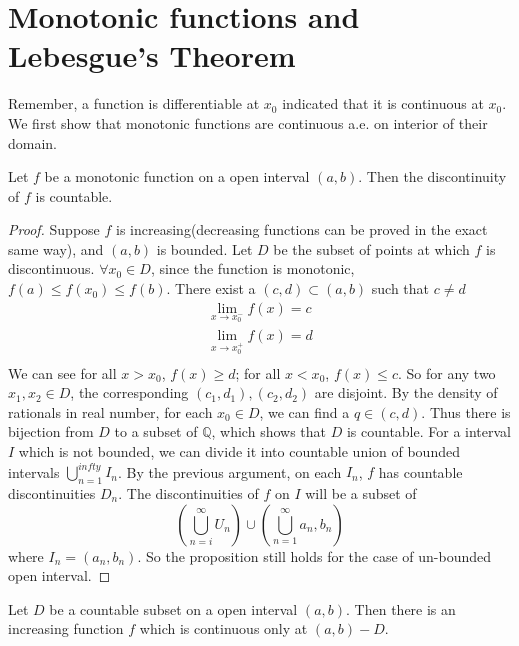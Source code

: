 \documentclass[lang=en, 12pt]{elegantbook}
\newcommand{\QQ}{\mathbb{Q}}
\begin{document}
    \section{Monotonic functions and Lebesgue's Theorem }
        Remember, a function is differentiable at $x_0$ indicated that it is continuous at $x_0$. We first show that monotonic functions
    are continuous a.e. on interior of their domain.
        \begin{theorem}\label{MonotonicFunctionIsContinuous}
            Let $f$ be a monotonic function on a open interval $(a,b)$. Then the discontinuity of $f$ is countable. 
        \end{theorem}
        \begin{proof}
            Suppose $f$ is increasing(decreasing functions can be proved in the exact same way), and $(a,b)$ is bounded.
        Let $D$ be the subset of points at which $f$ is discontinuous. $\forall x_0 \in D$, since the function is monotonic, 
        $f(a)\leq f(x_0) \leq f(b)$. There exist a $(c,d) \subset (a,b)$ such that $c\neq d$ 
        \begin{equation*}
            \begin{aligned}
                \lim_{x \to x_0^-} f(x) = c\\
                \lim_{x \to x_0^+} f(x) = d\\
            \end{aligned}
        \end{equation*}
        We can see for all $x> x_0$, $f(x) \geq d$; for all $x < x_0$, $f(x) \leq c$. So for any two $x_1, x_2 \in D$, 
        the corresponding $(c_1, d_1), (c_2, d_2)$ are disjoint.
        By the density of rationals in real number, for each $x_0 \in D$, we can find a $q \in (c,d)$. Thus there is bijection from
        $D$ to a subset of $\QQ$, which shows that $D$ is countable. 
            For a interval $I$ which is not bounded, we can divide it into countable union of bounded intervals $\bigcup_{n=1}^{infty} I_n$. 
        By the previous argument, on each $I_n$, $f$ has countable discontinuities $D_n$. The discontinuities of $f$ on $I$ will be a
        subset of $$(\bigcup_{n=i}^{\infty} U_n)\cup (\bigcup_{n=1}^{\infty} {a_n, b_n})$$
        where $I_n = (a_n, b_n)$. So the proposition still holds for the case of un-bounded open interval.
        \end{proof}
        \begin{proposition}
            Let $D$ be a countable subset on a open interval $(a,b)$. Then there is an increasing function $f$ which is continuous only
        at $(a,b) - D$.
        \end{proposition}
\end{document}
